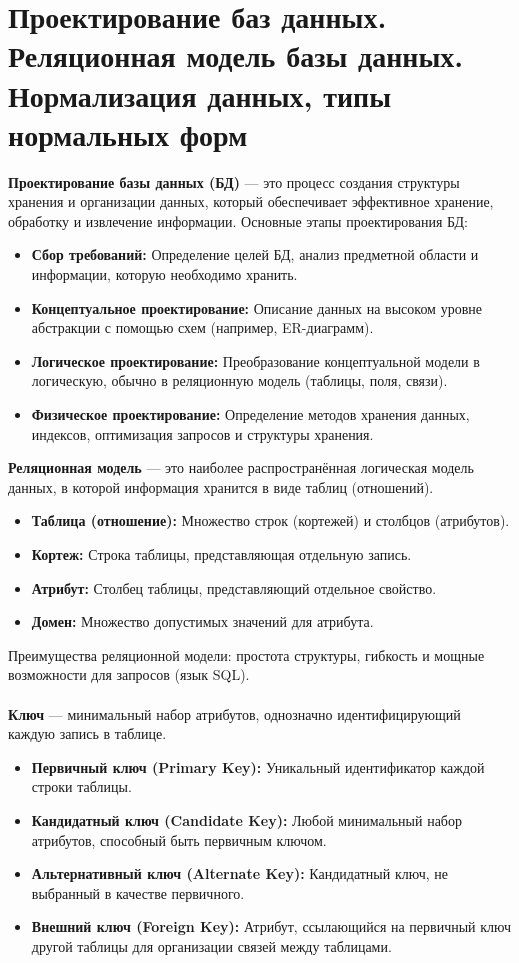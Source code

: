 \documentclass[a4paper, 12pt]{report}
\numberwithin{equation}{section}
\begin{document}
\section{Проектирование баз данных. Реляционная модель базы данных. Нормализация данных, типы нормальных форм}
\textbf{Проектирование базы данных (БД)} --- это процесс создания структуры хранения и организации данных, который обеспечивает эффективное хранение, обработку и извлечение информации. Основные этапы проектирования БД:
\begin{itemize}
	\item \textbf{Сбор требований:} Определение целей БД, анализ предметной области и информации, которую необходимо хранить.
	\item \textbf{Концептуальное проектирование:} Описание данных на высоком уровне абстракции с помощью схем (например, ER-диаграмм).
	\item \textbf{Логическое проектирование:} Преобразование концептуальной модели в логическую, обычно в реляционную модель (таблицы, поля, связи).
	\item \textbf{Физическое проектирование:} Определение методов хранения данных, индексов, оптимизация запросов и структуры хранения.
\end{itemize}
\textbf{Реляционная модель} --- это наиболее распространённая логическая модель данных, в которой информация хранится в виде таблиц (отношений).
\begin{itemize}
	\item \textbf{Таблица (отношение):} Множество строк (кортежей) и столбцов (атрибутов).
	\item \textbf{Кортеж:} Строка таблицы, представляющая отдельную запись.
	\item \textbf{Атрибут:} Столбец таблицы, представляющий отдельное свойство.
	\item \textbf{Домен:} Множество допустимых значений для атрибута.
\end{itemize}
Преимущества реляционной модели: простота структуры, гибкость и мощные возможности для запросов (язык SQL).
\\\\
\textbf{Ключ} --- минимальный набор атрибутов, однозначно идентифицирующий каждую запись в таблице.
\begin{itemize}
	\item \textbf{Первичный ключ (Primary Key):} Уникальный идентификатор каждой строки таблицы.
	\item \textbf{Кандидатный ключ (Candidate Key):} Любой минимальный набор атрибутов, способный быть первичным ключом.
	\item \textbf{Альтернативный ключ (Alternate Key):} Кандидатный ключ, не выбранный в качестве первичного.
	\item \textbf{Внешний ключ (Foreign Key):} Атрибут, ссылающийся на первичный ключ другой таблицы для организации связей между таблицами.
\end{itemize}
\end{document}
